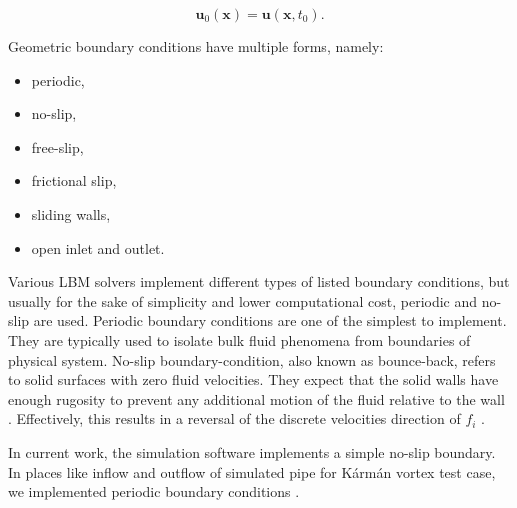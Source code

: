 \begin{equation}
	\label{eq:initial-conditions-velocity}
	\bm{u}_0 (\bm{x}) = \bm{u} (\bm{x},t_0).
\end{equation}

Geometric boundary conditions have multiple forms, namely:

\begin{itemize}
	\item periodic,
	\item no-slip,
	\item free-slip,
	\item frictional slip,
	\item sliding walls,
	\item open inlet and outlet.
\end{itemize}

Various LBM solvers implement different types of listed boundary conditions, but usually for the sake of simplicity and lower computational cost, periodic and no-slip are used. Periodic boundary conditions are one of the simplest to implement. They are typically used to isolate bulk fluid phenomena from boundaries of physical system. No-slip boundary-condition, also known as bounce-back, refers to solid surfaces with zero fluid velocities. They expect that the solid walls have enough rugosity to prevent any additional motion of the fluid relative to the wall \citep{succi2018}. Effectively, this results in a reversal of the discrete velocities direction of $f_i$ \citep{Mawson2014InteractiveFI}.

In current work, the simulation software implements a simple no-slip boundary. In places like inflow and outflow of simulated pipe for Kármán vortex test case, we implemented periodic boundary conditions \citep{succi2001lattice}.

%
%
%
%
%
%
%

